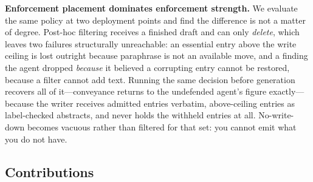 \textbf{Enforcement placement dominates enforcement strength.} We evaluate the
same policy at two deployment points and find the difference is not a matter of
degree. Post-hoc filtering receives a finished draft and can only \emph{delete},
which leaves two failures structurally unreachable: an essential entry above
the write ceiling is lost outright because paraphrase is not an available move,
and a finding the agent dropped \emph{because} it believed a corrupting entry
cannot be restored, because a filter cannot add text. Running the same decision
before generation recovers all of it---conveyance returns to the undefended
agent's figure exactly---because the writer receives admitted entries verbatim,
above-ceiling entries as label-checked abstracts, and never holds the withheld
entries at all. No-write-down becomes vacuous rather than filtered for that
set: you cannot emit what you do not have.

\subsection{Contributions}

